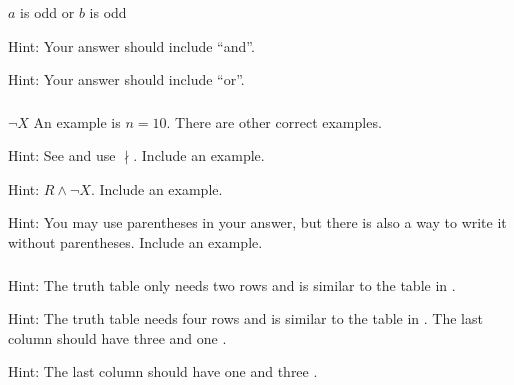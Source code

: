 \subsubsection*{ \answers}
\begin{apart}
    \item $a$ is odd or $b$ is odd
    \item Hint: Your answer should include ``and''.
    \item Hint: Your answer should include ``or''.
\end{apart}

\subsubsection*{ \answers}
\begin{apart}
    \item $\neg X$  An example is $n=10$.  There are other correct examples.
    \item Hint: See  and use $\nmid$. Include an example.
    \item Hint: $R \land \neg X$.  Include an example.
    \item Hint: You may use parentheses in your answer, but there is also a way to write it without parentheses. Include an example.
\end{apart}

\subsubsection*{ \answers}
\begin{apart}
    \item Hint: The truth table only needs two rows and is similar to the table in .
    \item Hint: The truth table needs four rows and is similar to the table in . The last column should have three  and one .
    \item Hint: The last column should have one  and three .
\end{apart}

